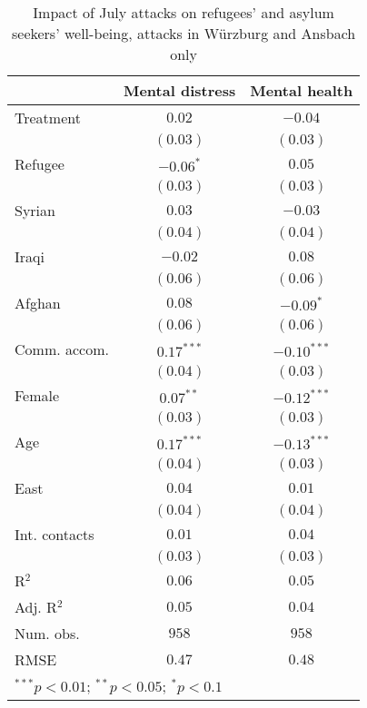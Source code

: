 
\begin{table}
\caption{Impact of July attacks on refugees' and asylum seekers' well-being, attacks in Würzburg and Ansbach only}
\begin{center}
\begin{tabular}{l c c}
\toprule
 & Mental distress & Mental health \\
\midrule
Treatment     & $0.02$       & $-0.04$       \\
              & $(0.03)$     & $(0.03)$      \\
Refugee       & $-0.06^{*}$  & $0.05$        \\
              & $(0.03)$     & $(0.03)$      \\
Syrian        & $0.03$       & $-0.03$       \\
              & $(0.04)$     & $(0.04)$      \\
Iraqi         & $-0.02$      & $0.08$        \\
              & $(0.06)$     & $(0.06)$      \\
Afghan        & $0.08$       & $-0.09^{*}$   \\
              & $(0.06)$     & $(0.06)$      \\
Comm. accom.  & $0.17^{***}$ & $-0.10^{***}$ \\
              & $(0.04)$     & $(0.03)$      \\
Female        & $0.07^{**}$  & $-0.12^{***}$ \\
              & $(0.03)$     & $(0.03)$      \\
Age           & $0.17^{***}$ & $-0.13^{***}$ \\
              & $(0.04)$     & $(0.03)$      \\
East          & $0.04$       & $0.01$        \\
              & $(0.04)$     & $(0.04)$      \\
Int. contacts & $0.01$       & $0.04$        \\
              & $(0.03)$     & $(0.03)$      \\
\midrule
R$^2$         & $0.06$       & $0.05$        \\
Adj. R$^2$    & $0.05$       & $0.04$        \\
Num. obs.     & $958$        & $958$         \\
RMSE          & $0.47$       & $0.48$        \\
\bottomrule
\multicolumn{3}{l}{\scriptsize{$^{***}p<0.01$; $^{**}p<0.05$; $^{*}p<0.1$}}
\end{tabular}
\label{tab_mhealth_no_nice}
\end{center}
\end{table}
